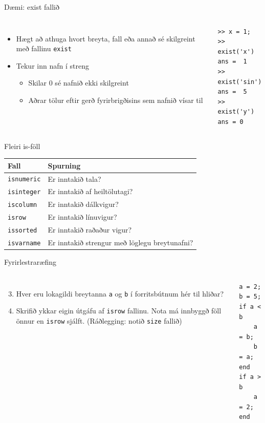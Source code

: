 \documentclass{beamer}
\begin{document}
\begin{frame}[fragile]{Dæmi: exist fallið}
\begin{columns}
\begin{itemize}
 \item Hægt að athuga hvort breyta, fall eða annað sé skilgreint með fallinu \texttt{exist}
 \item Tekur inn nafn í streng
 \begin{itemize}
  \item Skilar 0 sé nafnið ekki skilgreint
  \item Aðrar tölur eftir gerð fyrirbrigðisins sem nafnið vísar til
 \end{itemize}
\end{itemize}
\begin{verbatim}
>> x = 1;
>> exist('x')
ans =  1
>> exist('sin')
ans =  5
>> exist('y')
ans = 0
\end{verbatim}
\end{columns}
\end{frame}

\begin{frame}{Fleiri is-föll}
\begin{center}
\begin{tabular}{ll}
\toprule
Fall&Spurning\\
\midrule
\texttt{isnumeric}&Er inntakið tala?\\
\texttt{isinteger}&Er inntakið af heiltölutagi?\\
\texttt{iscolumn}&Er inntakið dálkvigur?\\
\texttt{isrow}&Er inntakið línuvigur?\\
\texttt{issorted}&Er inntakið raðaður vigur?\\
\texttt{isvarname}&Er inntakið strengur með löglegu breytunafni?\\
\bottomrule
\end{tabular}
\end{center}
\end{frame}

\begin{frame}[fragile]{Fyrirlestraræfing}
    \begin{columns}
        \begin{enumerate}
            \setcounter{enumi}{2}
            \item Hver eru lokagildi breytanna \texttt{a} og \texttt{b} í forritsbútnum hér til hliðar?
            \item Skrifið ykkar eigin útgáfu af \texttt{isrow} fallinu. Nota má innbyggð föll önnur en \texttt{isrow} sjálft. (Ráðlegging: notið \texttt{size} fallið)
        \end{enumerate}
\begin{verbatim}
a = 2; 
b = 5;
if a < b
    a = b; 
    b = a;
end
if a > b
    a = 2;
end
\end{verbatim}
    \end{columns}
\end{frame}
\end{document}
